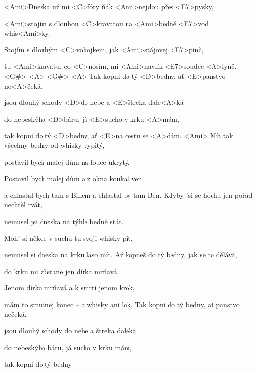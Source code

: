
\zs
<Ami>Dneska už mi <C>fóry ňák <Ami>nejdou přes <E7>pysky,

<Ami>stojím s dlouhou <C>kravatou na <Ami>bedně <E7>vod whis<Ami>ky.

Stojím s dlouhým <C>vobojkem, jak <Ami>stájovej <E7>pinč,

tu <Ami>kravatu, co <C>nosím, mi <Ami>navlík <E7>soudce <A>lynč. <G#> <A> <G#> <A>
\ks
\zr
Tak kopni do tý <D>bedny, ať <E>panstvo ne<A>čeká,

jsou dlouhý schody <D>do nebe a <E>štreka dale<A>ká

do nebeskýho <D>báru, já <E>sucho v krku <A>mám,

tak kopni do tý <D>bedny, ať <E>na cestu se <A>dám. <Ami>
\kr
\zs
Mít tak všechny bedny od whisky vypitý,

postavil bych malej dům na louce ukrytý.

Postavil bych malej dům a z okna koukal ven

a chlastal bych tam s Billem a chlastal by tam Ben.
\ks
\zr \kr
\zs
Kdyby 'si se hochu jen pořád nechtěl rvát,

nemusel jsi dneska na týhle bedně stát.

Moh' si někde v suchu tu svoji whisky pít,

nemusel si dneska na krku laso mít.
\ks
\zr \kr
\zs
Až kopneš do tý bedny, jak se to dělává,

do krku mi zůstane jen dírka mrňavá.

Jenom dírka mrňavá a k smrti jenom krok,

mám to smutnej konec -- a whisky ani lok.
\ks
\zr
Tak kopni do tý bedny, ať panstvo nečeká,

jsou dlouhý schody do nebe a štreka daleká

do nebeskýho báru, já sucho v krku mám,

tak kopni do tý bedny --
\kr

\kp
